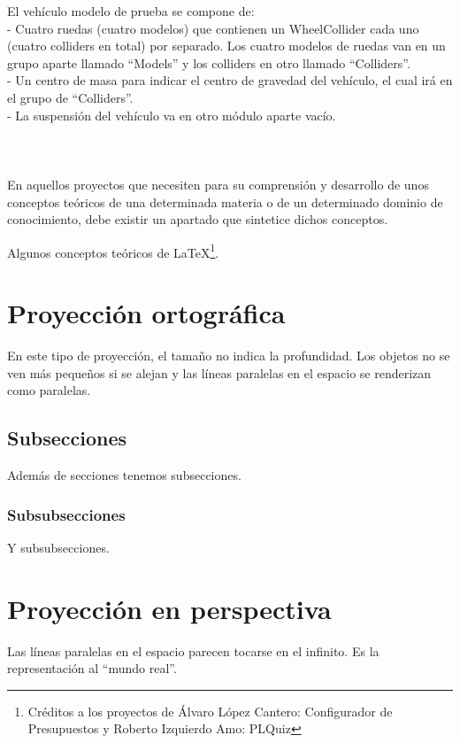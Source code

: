 El vehículo modelo de prueba se compone de: 
\\- Cuatro ruedas (cuatro modelos) que contienen un WheelCollider cada uno (cuatro colliders en total) por separado. Los cuatro modelos de ruedas van en un grupo aparte llamado “Models” y los colliders en otro llamado “Colliders”.
\\- Un centro de masa para indicar el centro de gravedad del vehículo, el cual irá en el grupo de “Colliders”.
\\- La suspensión del vehículo va en otro módulo aparte vacío.
\\\\
\\\\
En aquellos proyectos que necesiten para su comprensión y desarrollo de unos conceptos teóricos de una determinada materia o de un determinado dominio de conocimiento, debe existir un apartado que sintetice dichos conceptos.

Algunos conceptos teóricos de \LaTeX \footnote{Créditos a los proyectos de Álvaro López Cantero: Configurador de Presupuestos y Roberto Izquierdo Amo: PLQuiz}.

\section{Proyección ortográfica}

En este tipo de proyección, el tamaño no indica la profundidad. Los objetos no se ven más pequeños si se alejan y las líneas paralelas en el espacio se renderizan como paralelas.

\subsection{Subsecciones}

Además de secciones tenemos subsecciones.


\subsubsection{Subsubsecciones}

Y subsubsecciones. 


\section{Proyección en perspectiva}

Las líneas paralelas en el espacio parecen tocarse en el infinito. Es la representación al “mundo real”.

